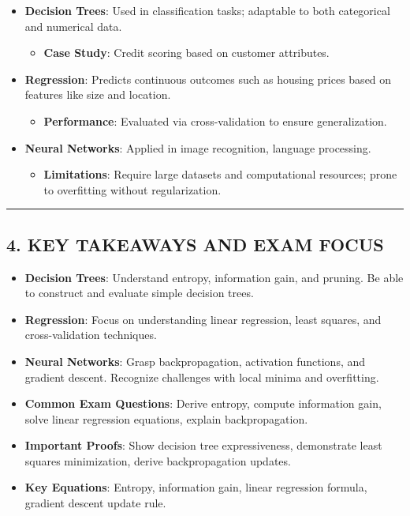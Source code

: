 \documentclass[
  12pt,
]{report}
\providecommand{\tightlist}{%
  \setlength{\itemsep}{0pt}\setlength{\parskip}{0pt}}
\begin{document}
\begin{itemize}
\tightlist
\item
  \textbf{Decision Trees}: Used in classification tasks; adaptable to both categorical and numerical data.

  \begin{itemize}
  \tightlist
  \item
    \textbf{Case Study}: Credit scoring based on customer attributes.
  \end{itemize}
\item
  \textbf{Regression}: Predicts continuous outcomes such as housing prices based on features like size and location.

  \begin{itemize}
  \tightlist
  \item
    \textbf{Performance}: Evaluated via cross-validation to ensure generalization.
  \end{itemize}
\item
  \textbf{Neural Networks}: Applied in image recognition, language processing.

  \begin{itemize}
  \tightlist
  \item
    \textbf{Limitations}: Require large datasets and computational resources; prone to overfitting without regularization.
  \end{itemize}
\end{itemize}

\begin{center}\rule{0.5\linewidth}{0.5pt}\end{center}

\subsection{4. KEY TAKEAWAYS AND EXAM FOCUS}\label{key-takeaways-and-exam-focus}

\begin{itemize}
\tightlist
\item
  \textbf{Decision Trees}: Understand entropy, information gain, and pruning. Be able to construct and evaluate simple decision trees.
\item
  \textbf{Regression}: Focus on understanding linear regression, least squares, and cross-validation techniques.
\item
  \textbf{Neural Networks}: Grasp backpropagation, activation functions, and gradient descent. Recognize challenges with local minima and overfitting.
\item
  \textbf{Common Exam Questions}: Derive entropy, compute information gain, solve linear regression equations, explain backpropagation.
\item
  \textbf{Important Proofs}: Show decision tree expressiveness, demonstrate least squares minimization, derive backpropagation updates.
\item
  \textbf{Key Equations}: Entropy, information gain, linear regression formula, gradient descent update rule.
\end{itemize}
\end{document}
